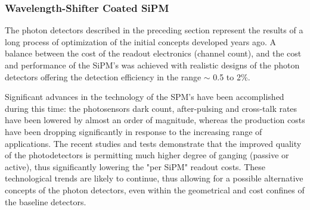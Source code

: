 



\subsubsection{Wavelength-Shifter Coated SiPM} 
The photon detectors described in the preceding section represent the results of a long process of optimization of the initial concepts developed years ago. A balance between the cost of the readout electronics (channel count), and the cost and performance of the SiPM's was achieved with realistic designs of the photon detectors offering the detection efficiency in the range $\sim$ 0.5 to 2\%.
 
Significant advances in the technology of the SPM's have been accomplished during this time: the photosensors dark count, after-pulsing and cross-talk rates have been lowered by almost an order of magnitude, whereas the production costs have been dropping significantly in response to the increasing range of applications.  The recent studies and tests demonstrate that the improved quality of the photodetectors is permitting much higher degree of ganging (passive or active), thus significantly lowering the "per SiPM" readout costs.
These technological trends are likely to continue, thus allowing for a possible alternative concepts of the photon detectors, even within the geometrical and cost confines of the baseline detectors.

